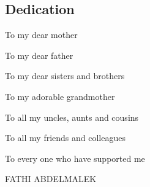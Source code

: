 \newenvironment{dedication}
{
	\thispagestyle{empty}
	\vspace*{\stretch{1}}
	\itshape
	\raggedleft
}
{\par
	\vspace{\stretch{3}}
	\clearpage
}
\begin{center}
	\section*{Dedication}
\end{center}
\begin{dedication}
	To my dear mother
	
	To my dear father
	
	To my dear sisters and brothers
	
	To my adorable grandmother
	
	To all my uncles, aunts and cousins
	
	To all my friends and colleagues
	
	To every one who have supported me
	\par
	\vspace{2\baselineskip}
	
	\vspace{\baselineskip}
	FATHI ABDELMALEK
\end{dedication}